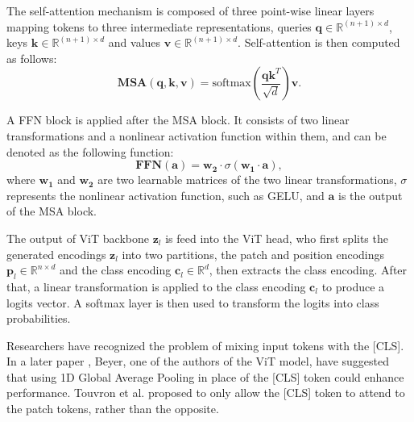 \documentclass[anon,12pt]{colt2024} %
\begin{document}
The self-attention mechanism is composed of three point-wise linear layers mapping tokens to three intermediate representations, queries $\mathbf{q} \in \mathbb{R}^{(n+1) \times d}$, keys $\mathbf{k} \in \mathbb{R}^{(n+1) \times d}$ and values $\mathbf{v} \in \mathbb{R}^{(n+1) \times d}$.
Self-attention is then computed as follows:
\begin{equation}
   \mathbf{MSA}(\mathbf{q}, \mathbf{k}, \mathbf{v}) = \mathrm{softmax} \left( \frac{\mathbf{q}\mathbf{k}^T}{\sqrt{d}} \right)  \mathbf{v}.
\end{equation}

A FFN block is applied after the MSA block. It consists of two linear transformations and a nonlinear activation function within them, and can be denoted as the following function:
\begin{equation}
  \mathbf{FFN}(\mathbf{a}) = \mathbf{w_2} \cdot \sigma(\mathbf{w_1} \cdot \mathbf{a}),
\end{equation}
where $\mathbf{w_1}$ and $\mathbf{w_2}$ are two learnable matrices of the two linear transformations, $\sigma$ represents the nonlinear activation function, such as GELU, and  $\mathbf{a}$ is the output of the MSA block.

The output of ViT backbone $\mathbf{z}_l$ is feed into the ViT head, who first splits the generated encodings $\mathbf{z}_l$ into two partitions, the patch and position encodings $\mathbf{p}_l \in \mathbb{R} ^ {n \times d}$ and the class encoding $\mathbf{c}_l \in \mathbb{R}^d$, then extracts the class encoding.
After that, a linear transformation is applied to the class encoding $\mathbf{c}_l$ to produce a logits vector. A softmax layer is then used to transform the logits into class probabilities.

Researchers have recognized the problem of mixing input tokens with the [CLS]. In a later paper \cite{beyer2022better}, Beyer, one of the authors of the ViT model, have suggested that using 1D Global Average Pooling in place of the [CLS] token could enhance performance.
Touvron et al. \cite{touvron2021going} proposed to only allow the [CLS] token to attend to the patch tokens, rather than the opposite.
\end{document}
